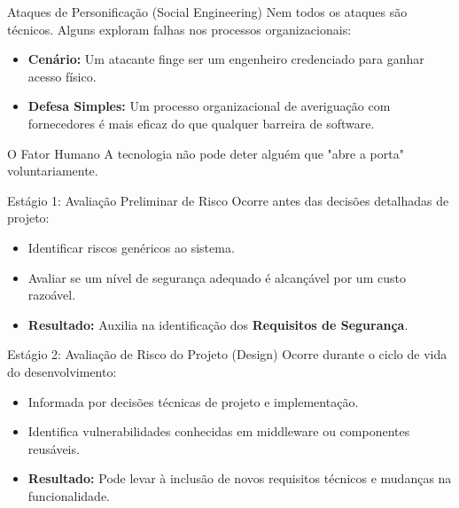 \documentclass[aspectratio=169]{beamer}
\begin{document}
\begin{frame}{Ataques de Personificação (Social Engineering)}
    Nem todos os ataques são técnicos. Alguns exploram falhas nos processos organizacionais:
    \begin{itemize}
        \item \textbf{Cenário:} Um atacante finge ser um engenheiro credenciado para ganhar acesso físico.
        \item \textbf{Defesa Simples:} Um processo organizacional de averiguação com fornecedores é mais eficaz do que qualquer barreira de software.
    \end{itemize}
    \begin{alertblock}{O Fator Humano}
        A tecnologia não pode deter alguém que "abre a porta" voluntariamente.
    \end{alertblock}
\end{frame}

\begin{frame}{Estágio 1: Avaliação Preliminar de Risco}
    Ocorre antes das decisões detalhadas de projeto:
    \begin{itemize}
        \item Identificar riscos genéricos ao sistema.
        \item Avaliar se um nível de segurança adequado é alcançável por um custo razoável.
        \item \textbf{Resultado:} Auxilia na identificação dos \textbf{Requisitos de Segurança}.
    \end{itemize}
\end{frame}

\begin{frame}{Estágio 2: Avaliação de Risco do Projeto (Design)}
    Ocorre durante o ciclo de vida do desenvolvimento:
    \begin{itemize}
        \item Informada por decisões técnicas de projeto e implementação.
        \item Identifica vulnerabilidades conhecidas em middleware ou componentes reusáveis.
        \item \textbf{Resultado:} Pode levar à inclusão de novos requisitos técnicos e mudanças na funcionalidade.
    \end{itemize}
\end{frame}
\end{document}
